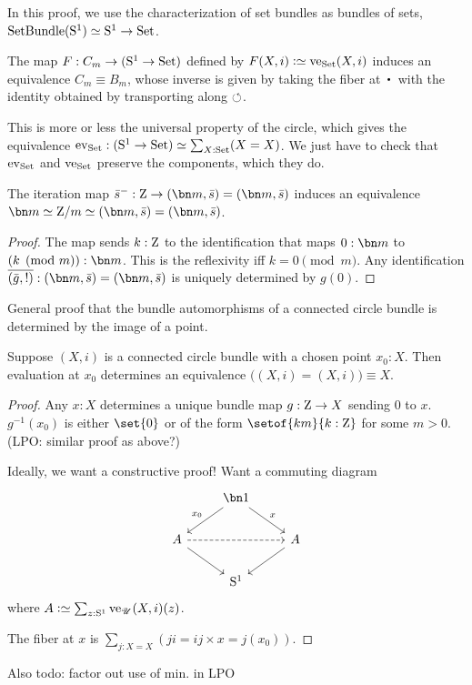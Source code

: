 In this proof, we use the characterization of set bundles as bundles of sets,
\ie $\mathrm{SetBundle}({\mathrm{S}^1}) \simeq {\mathrm{S}^1} \to \mathrm{Set}$.
\begin{theorem}
  The map $F : C_m \to ({\mathrm{S}^1} \to \mathrm{Set})$ defined by
  $F(X,i) \defeq \ve_\Set(X,i)$ induces an equivalence $C_m \equiv B_m$,
  whose inverse is given by taking the fiber at $\base$ with the identity obtained by transporting along $\circlearrowleft$.
\end{theorem}
This is more or less the universal property of the circle,
which gives the equivalence $\ev_\Set : (\Sc \to \Set) \equiv \sum_{X:\Set}(X=X)$.
We just have to check that $\ev_\Set$ and $\ve_\Set$ preserve the components,
which they do.

\begin{theorem}
  The iteration map $\etop s^- : \zet \to (\bn m,\etop s)=(\bn m,\etop s)$
  induces an equivalence $\bn m \equiv \zet/m \equiv (\bn m,\etop s)=(\bn m,\etop s)$.
\end{theorem}
\begin{proof}
  The map sends $k:\mathrm{Z}$ to the identification that maps $0:\bn m$ to $(k\pmod m) : \bn m$. This is the reflexivity iff $k=0 \pmod m$.
  Any identification $\pathpair{\etop g}{!} : (\bn m,\etop s)=(\bn m,\etop s)$
  is uniquely determined by $g(0)$.
\end{proof}
General proof that the bundle automorphisms of a connected circle bundle
is determined by the image of a point.
\begin{theorem}
  Suppose $(X,i)$ is a connected circle bundle with a chosen point $x_0:X$.
  Then evaluation at $x_0$ determines an equivalence
  $\bigl((X,i) = (X,i)\bigr) \equiv X$.
\end{theorem}
\begin{proof}
  Any $x:X$ determines a unique bundle map $g:\mathrm{Z} \to X$ sending $0$ to $x$.
  $g^{-1}(x_0)$ is either $\set{0}$ or of the form $\setof{km}{k:\zet}$ for some $m>0$. (LPO: similar proof as above?)

  Ideally, we want a constructive proof! Want a commuting diagram
  \[
    \begin{tikzcd}
      & \bn 1 \ar[dl,"x_0"']\ar[dr,"x"] &\\
      A \ar[rr,dashed]\ar[dr] && A\ar[dl] \\
      & \Sc &
    \end{tikzcd}
  \]
  where $A \defeq \sum_{z:\Sc}\ve_\UU(X,i)(z)$.

  The fiber at $x$ is $\sum_{j : X=X}(ji=ij \times x=j(x_0))$.

\end{proof}
Also todo: factor out use of min. in LPO
